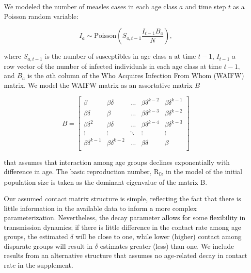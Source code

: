 We modeled the number of measles cases in each age class \(a\) and time step \(t\) as a Poisson random variable:

\begin{equation}
I_a \sim \text{Poisson}\left(S_{a,t-1} \frac{I_{t-1}B_a}{N} \right),
\end{equation}

where \(S_{a,t-1}\) is the number of susceptibles in age class a at time \(t-1\), \(I_{t-1}\) a row vector of the number of infected individuals in each age class at time \(t-1\), and \(B_a\) is the \(a\)th column of the Who Acquires Infection From Whom (WAIFW) matrix.  We model the WAIFW matrix as an assortative matrix \(B\)

\begin{equation}
B = \left[{
\begin{array}{ccccc}
  {\beta} & {\beta \delta} & \ldots & {\beta \delta^{k-2}} & {\beta \delta^{k-1}}  \\
  {\beta \delta} & {\beta} & \ldots & {\beta \delta^{k-3}} & {\beta \delta^{k-2}} \\
{\beta \delta^2} & {\beta \delta} & \ldots & {\beta \delta^{k-4}} & {\beta \delta^{k-3}}  \\
  \vdots & \vdots & \ddots & \vdots & \vdots \\
  {\beta \delta^{k-1}} & {\beta \delta^{k-2}} & \ldots & {\beta \delta} & {\beta}  \\
\end{array}
}\right]
\end{equation}

that assumes that interaction among age groups declines exponentially with difference in age. The basic reproduction number, R\textsubscript{0}, in the model of the initial population size is taken as the dominant eigenvalue of the matrix B.

Our assumed contact matrix structure is simple, reflecting the fact that there is little information in the available data to inform a more complex parameterization. Nevertheless, the decay parameter allows for some flexibility in transmission dynamics; if there is little difference in the contact rate among age groups, the estimated $\delta$ will be close to one, while lower (higher) contact among disparate groups will result in $\delta$ estimates greater (less) than one. We include results from an alternative structure that assumes no age-related decay in contact rate in the supplement.
